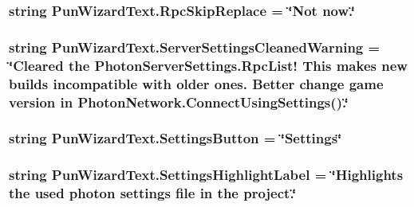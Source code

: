 \subsubsection[{\texorpdfstring{Rpc\+Skip\+Replace}{RpcSkipReplace}}]{\setlength{\rightskip}{0pt plus 5cm}string Pun\+Wizard\+Text.\+Rpc\+Skip\+Replace = \char`\"{}Not now.\char`\"{}}\hypertarget{class_pun_wizard_text_a34ac77aec040899c39d68191c5a3084c}{}\label{class_pun_wizard_text_a34ac77aec040899c39d68191c5a3084c}
\subsubsection[{\texorpdfstring{Server\+Settings\+Cleaned\+Warning}{ServerSettingsCleanedWarning}}]{\setlength{\rightskip}{0pt plus 5cm}string Pun\+Wizard\+Text.\+Server\+Settings\+Cleaned\+Warning = \char`\"{}Cleared the Photon\+Server\+Settings.\+Rpc\+List! This makes new builds incompatible with older ones. Better change game version in {\bf Photon\+Network.\+Connect\+Using\+Settings}().\char`\"{}}\hypertarget{class_pun_wizard_text_a1fcd4eff5d7841e61870ac8fe2e2158d}{}\label{class_pun_wizard_text_a1fcd4eff5d7841e61870ac8fe2e2158d}
\subsubsection[{\texorpdfstring{Settings\+Button}{SettingsButton}}]{\setlength{\rightskip}{0pt plus 5cm}string Pun\+Wizard\+Text.\+Settings\+Button = \char`\"{}Settings\char`\"{}}\hypertarget{class_pun_wizard_text_a9e1177cd98a9d2882313a00f0e0af5d8}{}\label{class_pun_wizard_text_a9e1177cd98a9d2882313a00f0e0af5d8}
\subsubsection[{\texorpdfstring{Settings\+Highlight\+Label}{SettingsHighlightLabel}}]{\setlength{\rightskip}{0pt plus 5cm}string Pun\+Wizard\+Text.\+Settings\+Highlight\+Label = \char`\"{}Highlights the used photon settings file in the project.\char`\"{}}\hypertarget{class_pun_wizard_text_a5dc1c06f3b528de9f8f0fc826b188141}{}\label{class_pun_wizard_text_a5dc1c06f3b528de9f8f0fc826b188141}
